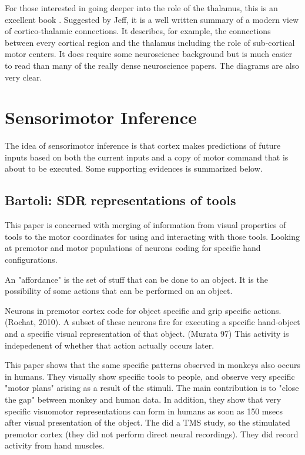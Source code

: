 \documentclass{article} %
\begin{document}
For those interested in going deeper into the role of the thalamus, this is an
excellent book \cite{Sherman}. Suggested by Jeff, it is a well written summary
of a modern view of cortico-thalamic connections. It describes, for example, the
connections between every cortical region and the thalamus including the role of
sub-cortical motor centers. It does require some neuroscience background but is
much easier to read than many of the really dense neuroscience papers. The
diagrams are also very clear.

\section{Sensorimotor Inference}

The idea of sensorimotor inference is that cortex makes predictions of future
inputs based on both the current inputs and a copy of motor command that is
about to be executed.  Some supporting evidences is summarized below.

\subsection{Bartoli: SDR representations of tools}

This paper \cite{Bartoli2014} is concerned with merging of information from
visual properties of tools to the motor coordinates for using and interacting
with those tools. Looking at premotor and motor populations of neurons coding
for specific hand configurations.

An "affordance" is the set of stuff that can be done to an object.  It is the
possibility of some actions that can be performed on an object.

Neurons in premotor cortex code for object specific and grip specific actions.
(Rochat, 2010). A subset of these neurons fire for executing a specific
hand-object and a specific visual representation of that object. (Murata 97)
This activity is indepedenent of whether that action actually occurs later.

This paper shows that the same specific patterns observed in monkeys also occurs
in humans.  They visually show specific tools to people, and observe very
specific "motor plans" arising as a result of the stimuli. The main contribution
is to "close the gap" between monkey and human data. In addition, they show that
very specific visuomotor representations can form in humans as soon as 150 msecs
after visual presentation of the object.  The did a TMS study, so the stimulated
premotor cortex (they did not perform direct neural recordings).  They did
record activity from hand muscles.
\end{document}
